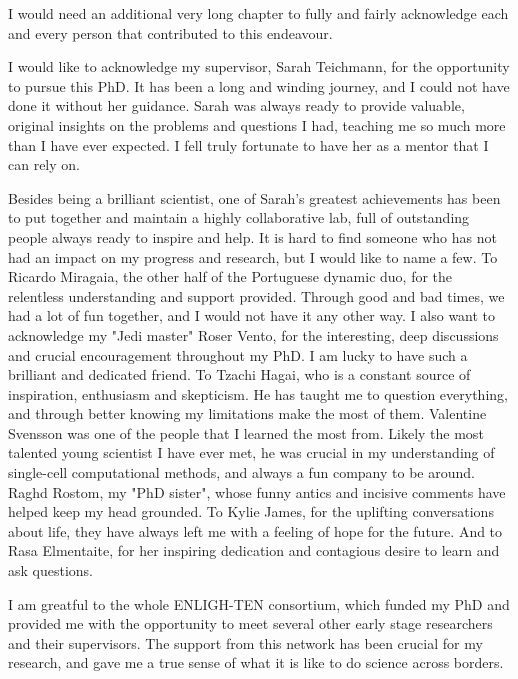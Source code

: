 
\begin{acknowledgements}      


I would need an additional very long chapter to fully and fairly acknowledge each and every person that contributed to this endeavour.

I would like to acknowledge my supervisor, Sarah Teichmann, for the opportunity to pursue this PhD. It has been a long and winding journey, and I could not have done it without her guidance. Sarah was always ready to provide valuable, original insights on the problems and questions I had, teaching me so much more than I have ever expected. I fell truly fortunate to have her as a mentor that I can rely on.

Besides being a brilliant scientist, one of Sarah's greatest achievements has been to put together and maintain a highly collaborative lab, full of outstanding people always ready to inspire and help. It is hard to find someone who has not had an impact on my progress and research, but I would like to name a few. To Ricardo Miragaia, the other half of the Portuguese dynamic duo, for the relentless understanding and support provided. Through good and bad times, we had a lot of fun together, and I would not have it any other way. I also want to acknowledge my "Jedi master" Roser Vento, for the interesting, deep discussions and crucial encouragement throughout my PhD. I am lucky to have such a brilliant and dedicated friend. To Tzachi Hagai, who is a constant source of inspiration, enthusiasm and skepticism. He has taught me to question everything, and through better knowing my limitations make the most of them. Valentine Svensson was one of the people that I learned the most from. Likely the most talented young scientist I have ever met, he was crucial in my understanding of single-cell computational methods, and always a fun company to be around. Raghd Rostom, my "PhD sister", whose funny antics and incisive comments have helped keep my head grounded. To Kylie James, for the uplifting conversations about life, they have always left me with a feeling of hope for the future. And to Rasa Elmentaite, for her inspiring dedication and contagious desire to learn and ask questions.

I am greatful to the whole ENLIGH-TEN consortium, which funded my PhD and provided me with the opportunity to meet several other early stage researchers and their supervisors. The support from this network has been crucial for my research, and gave me a true sense of what it is like to do science across borders.


\end{acknowledgements}
